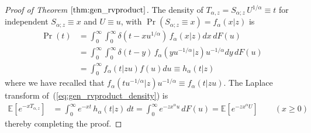 \documentclass[a4paper,12pt]{article}
\begin{document}
{{\begin{proof} [Proof of Theorem  $\ref{thm:gen_rvproduct}$]
\label{proof:gen_rvproduct}
The  density of $T_{\alpha,z}=S_{\alpha;z} \, U^{1/\alpha}\equiv t$ 
for  independent $S_{\alpha;z}\equiv x$ and $U\equiv u$, with $\Pr(S_{\alpha;z}\equiv x)=f_\alpha(x \vert z)$ is
\begin{align*}
\Pr(t) 
&= \int_0^\infty \int_0^\infty  \delta(t-xu^{1/\alpha}) \, f_\alpha(x \vert z)  dx \, dF(u) \\
&= \int_0^\infty \int_0^\infty  \delta(t-y)\,  f_\alpha(y u^{-1/\alpha} \vert z) u^{-1/\alpha}  dy \, dF(u)\\
&= \int_0^\infty  f_\alpha(t \vert z u)  f(u) du \equiv h_\alpha(t \vert z)
\end{align*}
where we have recalled  that $f_\alpha(t u^{-1/\alpha} \vert z) u^{-1/\alpha}\equiv f_\alpha(t\vert zu)$.
 The Laplace transform of~(\ref{eq:gen_rvproduct_density}) is %
\begin{align*}
\mathbb{E}\left[e^{-xT_{\alpha,z}}\right]
&= \int_0^\infty e^{-x t} \, h_{\alpha}(t \vert z) \, dt  
=  \int_0^\infty e^{-zx^\alpha u} \, dF(u) =  \mathbb{E}\left[e^{-zx^\alpha U}\right] 
  \qquad (x\ge0)
\end{align*}
thereby completing the proof.
\end{proof}

}}
\end{document}
